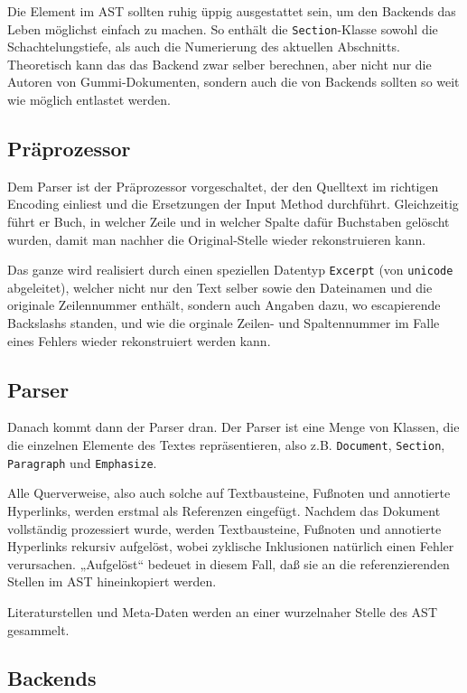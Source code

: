 \documentclass[12pt,openany]{book}
\begin{document}
\bigskip
%
Die Element im AST sollten ruhig üppig ausgestattet sein, um den Backends das
Leben möglichst einfach zu machen.  So enthält die \lstinline{Section}-Klasse
sowohl die Schachtelungstiefe, als auch die Numerierung des aktuellen
Abschnitts.  Theoretisch kann das das Backend zwar selber berechnen, aber nicht
nur die Autoren von Gummi-Dokumenten, sondern auch die von Backends sollten so
weit wie möglich entlastet werden.

\subsection{Präprozessor}

Dem Parser ist der Präprozessor vorgeschaltet, der den Quelltext im richtigen
Encoding einliest und die Ersetzungen der Input Method durchführt.
Gleichzeitig führt er Buch, in welcher Zeile und in welcher Spalte dafür
Buchstaben gelöscht wurden, damit man nachher die Original-Stelle wieder
rekonstruieren kann.

Das ganze wird realisiert durch einen speziellen Datentyp \verb|Excerpt| (von
\verb|unicode| abgeleitet), welcher nicht nur den Text selber sowie den
Dateinamen und die originale Zeilennummer enthält, sondern auch Angaben dazu,
wo escapierende Backslashs standen, und wie die orginale Zeilen- und
Spaltennummer im Falle eines Fehlers wieder rekonstruiert werden kann.

\subsection{Parser}

Danach kommt dann der Parser dran.  Der Parser ist eine Menge von Klassen, die
die einzelnen Elemente des Textes repräsentieren, also z.B. \verb|Document|,
\verb|Section|, \verb|Paragraph| und \verb|Emphasize|.

Alle Querverweise, also auch solche auf Textbausteine, Fußnoten und annotierte
Hyperlinks, werden erstmal als Referenzen eingefügt.  Nachdem das Dokument
vollständig prozessiert wurde, werden Textbausteine, Fußnoten und annotierte
Hyperlinks rekursiv aufgelöst, wobei zyklische Inklusionen natürlich einen
Fehler verursachen.  „Aufgelöst“ bedeuet in diesem Fall, daß sie an die
referenzierenden Stellen im AST hineinkopiert werden.

Literaturstellen und Meta-Daten werden an einer wurzelnaher Stelle des AST
gesammelt.

\subsection{Backends}
\end{document}
